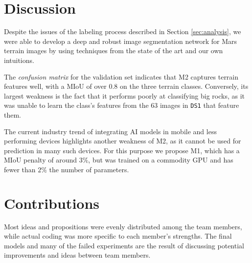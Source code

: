 \documentclass[11pt]{article}
\begin{document}
\begin{multicols}{2}
      \section{Discussion}

      Despite the issues of the labeling process described in Section \ref{sec:analysis}, we were able to develop a deep and robust image segmentation network for Mars terrain images by using techniques from the state of the art and our own intuitions. 
      
      The \textit{confusion matrix} for the validation set indicates that M2 captures terrain features well, with a MIoU of over $0.8$ on the three terrain classes. Conversely, its largest weakness is the fact that it performs poorly at classifying big rocks, as it was unable to learn the class's features from the $63$ images in \texttt{DS1} that feature them. 
      
      The current industry trend of integrating AI models in mobile and less performing devices %
      highlights another weakness of M2, as it cannot be used for prediction in many such devices. For this purpose we propose M1, which has a MIoU penalty of around $3\%$, but was trained on a commodity GPU and has fewer than $2\%$ the number of parameters.

      \section{Contributions}

      Most ideas and propositions were evenly distributed among the team members, while actual coding was more specific to each member's strengths. The final models and many of the failed experiments are the result of discussing potential improvements and ideas between team members.


\end{multicols}
\end{document}
